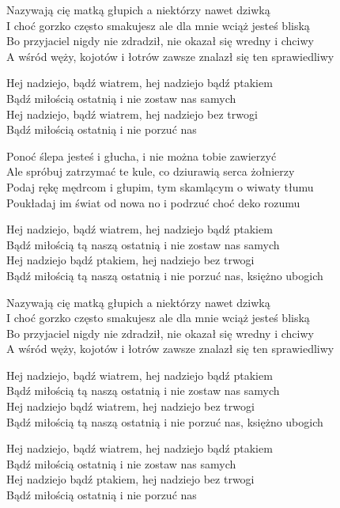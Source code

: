 \begin{text}
    \begin{footTwo}
    Nazywają cię matką głupich a niektórzy nawet dziwką\\
    I choć gorzko często smakujesz ale dla mnie wciąż jesteś bliską\\
    Bo przyjaciel nigdy nie zdradził, nie okazał się wredny i chciwy\\
    A wśród węży, kojotów i łotrów zawsze znalazł się ten sprawiedliwy

    Hej nadziejo, bądź wiatrem, hej nadziejo bądź ptakiem\\
    Bądź miłością ostatnią i nie zostaw nas samych\\
    Hej nadziejo, bądź wiatrem, hej nadziejo bez trwogi\\
    Bądź miłością ostatnią i nie porzuć nas

    Ponoć ślepa jesteś i głucha, i nie można tobie zawierzyć\\
    Ale spróbuj zatrzymać te kule, co dziurawią serca żołnierzy\\
    Podaj rękę mędrcom i głupim, tym skamlącym o wiwaty tłumu\\
    Poukładaj im świat od nowa no i podrzuć choć deko rozumu

    Hej nadziejo, bądź wiatrem, hej nadziejo bądź ptakiem\\
    Bądź miłością tą naszą ostatnią i nie zostaw nas samych\\
    Hej nadziejo bądź ptakiem, hej nadziejo bez trwogi\\
    Bądź miłością tą naszą ostatnią i nie porzuć nas, księżno ubogich

    Nazywają cię matką głupich a niektórzy nawet dziwką\\
    I choć gorzko często smakujesz ale dla mnie wciąż jesteś bliską\\
    Bo przyjaciel nigdy nie zdradził, nie okazał się wredny i chciwy\\
    A wśród węży, kojotów i łotrów zawsze znalazł się ten sprawiedliwy

    Hej nadziejo, bądź wiatrem, hej nadziejo bądź ptakiem\\
    Bądź miłością tą naszą ostatnią i nie zostaw nas samych\\
    Hej nadziejo bądź wiatrem, hej nadziejo bez trwogi\\
    Bądź miłością tą naszą ostatnią i nie porzuć nas, księżno ubogich

    Hej nadziejo, bądź wiatrem, hej nadziejo bądź ptakiem\\
    Bądź miłością ostatnią i nie zostaw nas samych\\
    Hej nadziejo bądź ptakiem, hej nadziejo bez trwogi\\
    Bądź miłością ostatnią i nie porzuć nas
\end{footTwo}
\end{text}
\begin{chord}

\end{chord}